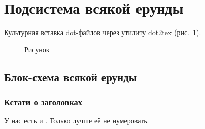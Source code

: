 \section{Подсистема всякой ерунды}

Культурная вставка dot-файлов через утилиту dot2tex (рис.~\ref{fig:fig02}).

\begin{figure}
  \centering
  \caption{Рисунок}
  \label{fig:fig02}
\end{figure}


\subsection{Блок-схема всякой ерунды}

\subsubsection*{Кстати о заголовках}

У нас есть и . Только лучше её не нумеровать.

